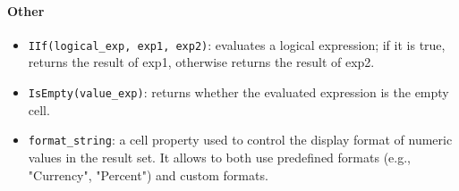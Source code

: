 \paragraph{Other}

\begin{itemize}
    \item \texttt{IIf(logical\_exp, exp1, exp2)}: evaluates a logical expression; if it is true, returns the result of exp1, otherwise returns the result of exp2.
    \item \texttt{IsEmpty(value\_exp)}: returns whether the evaluated expression is the empty cell.
    \item \texttt{format\_string}: a cell property used to control the display format of numeric values in the result set. It allows to both use predefined formats (e.g., "Currency", "Percent") and custom formats.
\end{itemize}
